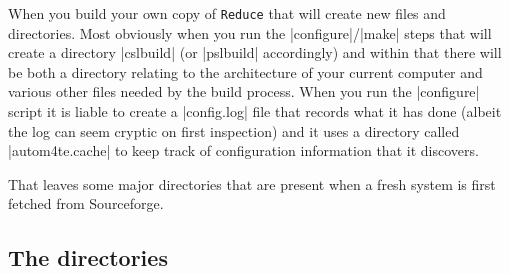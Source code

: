 \documentclass[12pt,twoside,openright]{memoir}
\newcommand{\reduce}{\texttt{Reduce}\xspace}
\begin{document}
When you build your own copy of \reduce that will create new files and
directories. Most obviously when you run the |configure|/|make| steps that will
create a directory |cslbuild| (or |pslbuild| accordingly) and within that there
will be both a directory relating to the architecture of your current computer
and various other files needed by the build process. When you run the
|configure| script it is liable to create a |config.log| file that records what
it has done (albeit the log can seem cryptic on first inspection) and it uses a
directory called |autom4te.cache| to keep track of configuration information
that it discovers.

That leaves some major directories that are present when a fresh system is
first fetched from Sourceforge.
\subsection{The directories}
\end{document}
